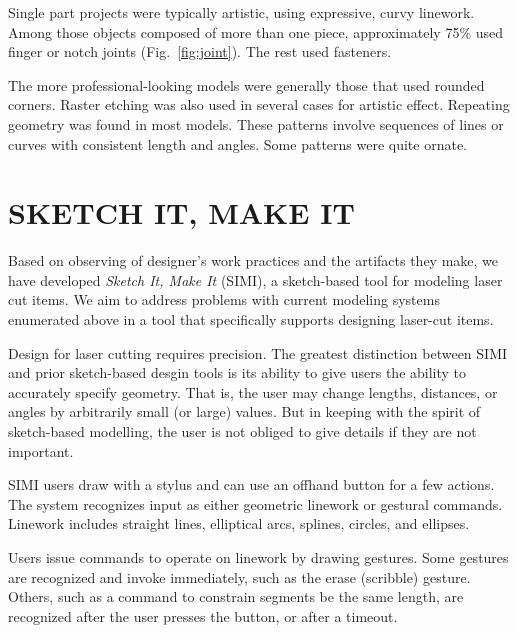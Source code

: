 \documentclass{article}
\begin{document}
Single part projects were typically artistic, using expressive, curvy
linework. Among those objects composed of more than one piece,
approximately 75\% used finger or notch joints
(Fig.~\ref{fig:joint}). The rest used fasteners.

The more professional-looking models were generally those that used
rounded corners. Raster etching was also used in several cases for
artistic effect. Repeating geometry was found in most models. These
patterns involve sequences of lines or curves with consistent length
and angles. Some patterns were quite ornate.

\section{SKETCH IT, MAKE IT}

Based on observing of designer's work practices and the artifacts they
make, we have developed \textit{Sketch It, Make It} (SIMI), a
sketch-based tool for modeling laser cut items. We aim to address
problems with current modeling systems enumerated above in a tool that
specifically supports designing laser-cut items.

Design for laser cutting requires precision. The greatest distinction
between SIMI and prior sketch-based desgin tools is its ability to
give users the ability to accurately specify geometry. That is, the
user may change lengths, distances, or angles by arbitrarily small (or
large) values. But in keeping with the spirit of sketch-based
modelling, the user is not obliged to give details if they are not
important.


SIMI users draw with a stylus and can use an offhand button for a few
actions. The system recognizes input as either geometric linework or
gestural commands. Linework includes straight lines, elliptical arcs,
splines, circles, and ellipses. 

Users issue commands to operate on linework by drawing gestures. Some
gestures are recognized and invoke immediately, such as the erase
(scribble) gesture. Others, such as a command to constrain segments be
the same length, are recognized after the user presses the button, or
after a timeout.
\end{document}
